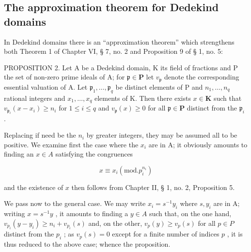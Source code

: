 \subsection{The approximation theorem for Dedekind domains}

In Dedekind domains there is an ``approximation theorem'' which strengthens both Theorem 1 of Chapter VI, § 7, no. 2 and Proposition 9 of § 1, no. 5:

PROPOSITION 2. Let A be a Dedekind domain, K its field of fractions and P the set of non-zero prime ideals of A; for \(\mathfrak{p} \in \mathbf{P}\) let \(v_{\mathfrak{p}}\) denote the corresponding essential valuation of A. Let \(\mathfrak{p}_1, \ldots, \mathfrak{p}_q\) be distinct elements of P and \(n_1, \ldots, n_q\) rational integers and \(x_1, \ldots, x_q\) elements of K. Then there exists \(x \in \mathbf{K}\) such that \(v_{\mathfrak{p}_i}(x - x_i) \geqslant n_i\) for \(1 \leqslant i \leqslant q\) and \(v_{\mathfrak{p}}(x) \geqslant 0\) for all \(\mathfrak{p} \in \mathbf{P}\) distinct from the \(\mathfrak{p}_i\) .

Replacing if need be the \(n_{i}\) by greater integers, they may be assumed all to be positive. We examine first the case where the \(x_{i}\) are in A; it obviously amounts to finding an \(x \in A\) satisfying the congruences

\[
x \equiv x _ {i} (\mathrm{mod.} p _ {i} ^ {n _ {i}})
\]

and the existence of \(x\) then follows from Chapter II, § 1, no. 2, Proposition 5.

We pass now to the general case. We may write \(x_{i} = s^{-1}y_{i}\) where \(s, y_{i}\) are in A; writing \(x = s^{-1}y\) , it amounts to finding a \(y \in A\) such that, on the one hand, \(v_{p_i}(y - y_i) \geqslant n_i + v_{p_i}(s)\) and, on the other, \(v_{p}(y) \geqslant v_{p}(s)\) for all \(p \in P\) distinct from the \(p_i\) ; as \(v_{p}(s) = 0\) except for a finite number of indices \(p\) , it is thus reduced to the above case; whence the proposition.

